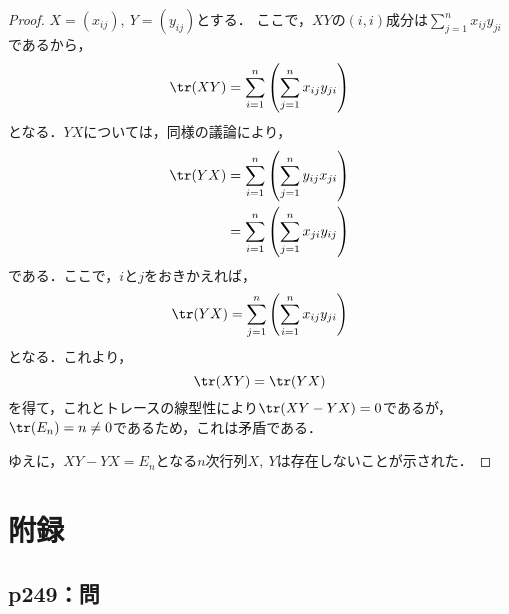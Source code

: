 \documentclass[uplatex,dvipdfmx,a4paper,10pt,fleqn]{jsarticle}
\begin{document}
\begin{tleftbar}
\begin{proof}
$X=(x_{ij}),~Y=(y_{ij})$とする．
ここで，$XY$の$(i,i)$成分は$\sum_{j=1}^{n} x_{ij} y_{ji}$であるから，
\begin{equation*}
\tr (XY)  =  \sum_{i=1}^{n} \left( \sum_{j=1}^{n} x_{ij} y_{ji} \right)
\end{equation*}
となる．$YX$については，同様の議論により，
\begin{align*}
\tr  (YX) & =  \sum_{i=1}^{n}\left( \sum_{j=1}^{n}  y_{ij} x_{ji} \right) \\
 & =  \sum_{i=1}^{n} \left( \sum_{j=1}^{n}  x_{ji} y_{ij} \right)
\end{align*}
である．ここで，$i$と$j$をおきかえれば，
\begin{equation}
\tr  (YX) = \sum_{j=1}^{n} \left( \sum_{i=1}^{n}  x_{ij} y_{ji} \right)
\end{equation}
となる．これより，
\begin{equation}
\tr (XY) = \tr  (YX)
\end{equation}
を得て，これとトレースの線型性により$\tr (XY-YX) =0$であるが，$\tr  (E_n) =n \neq 0$であるため，これは矛盾である．

ゆえに，$XY-YX=E_n$となる$n$次行列$X,~Y$は存在しないことが示された．
\end{proof}
\end{tleftbar}


\section*{附録\three}


\subsection*{p249：問}
\end{document}
